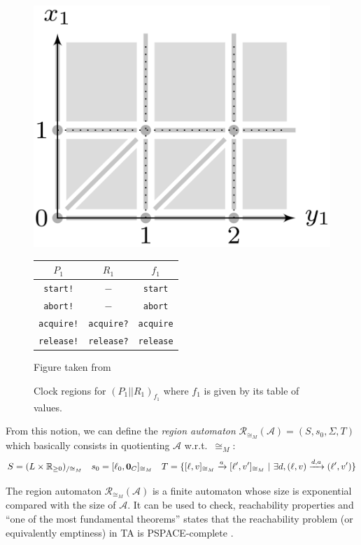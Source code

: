 \documentclass[11pt]{article}
\theoremstyle{definition}
\theoremstyle{remark}
\theoremstyle{definition}
\newtheorem{proposition}{Proposition}
\begin{document}
\begin{figure}[ht]
	\centering
	\includegraphics[width=.25\textwidth]{../img/TAreg.png}
	\qquad
	\begin{tabular}[b]{c|c||c}\hline
	$P_1$ & $R_1$ & $f_1$\\
	\hline
	\hline
	\texttt{start!} & $-$ & \texttt{start} \\ \hline
	\texttt{abort!} & $-$ & \texttt{abort} \\ \hline
	\texttt{acquire!} & \texttt{acquire?} & \texttt{acquire} \\ \hline
	\texttt{release!} & \texttt{release?} & \texttt{release} \\ \hline
	\end{tabular}
	\caption{Clock regions for $(P_1 || R_1)_{f_1}$ where $f_1$ is given by its table of values.}\label{fig:ta_reg}
	{\tiny Figure taken from \cite[Chapter 29.3]{handbook}}
\end{figure}

From this notion, we can define the \emph{region automaton} $\mathcal{R}_{\cong_M}(\mathcal{A}) = (S, s_0, \Sigma, T)$ which basically consists in quotienting $\mathcal{A}$ w.r.t.\ $\cong_M$:
$$
S = (L \times \mathbb{R}_{\geq 0})_{/\cong_M} \quad
s_0 = [\ell_0, \text{\bf 0}_C]_{\cong_M} \quad
T = \{ [\ell, v]_{\cong_M} \xrightarrow{a} [\ell', v']_{\cong_M}\ | \ \exists d, (\ell, v) \xrightarrow{d, a} (\ell', v')\}
$$


The region automaton $\mathcal{R}_{\cong_M}(\mathcal{A})$ is a finite automaton whose size is exponential compared with the size of $\mathcal{A}$. It can be used to check, reachability properties and ``one of the most fundamental theorems'' \cite[Chapter 29.2, Theorem 1]{handbook} states that the reachability problem (or equivalently emptiness) in TA is PSPACE-complete \cite[Section~4.5]{AlurDill}.
\end{document}
